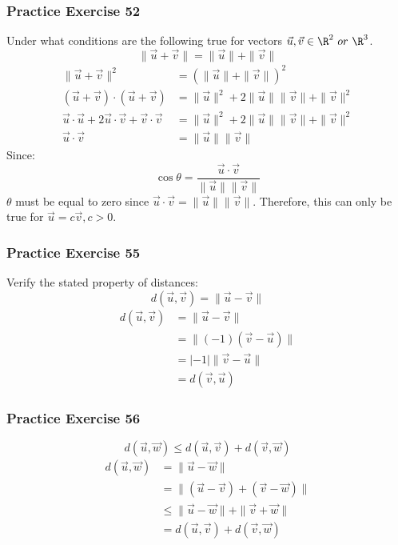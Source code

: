 \documentclass{math}
\begin{document}
\subsubsection*{Practice Exercise 52}
Under what conditions are the following true for vectors \( \vec{u},\vec{v}
\in\R^2\ or\ \R^3 \).
\[ \|\vec{u}+\vec{v}\| = \|\vec{u}\|+\|\vec{v}\| \]
\begin{align*}
  \|\vec{u}+\vec{v}\|^2 &= (\|\vec{u}\|+\|\vec{v}\|)^2 \\
  (\vec{u}+\vec{v})\cdot(\vec{u}+\vec{v}) &= \|\vec{u}\|^2+
    2\|\vec{u}\|\|\vec{v}\|+\|\vec{v}\|^2 \\
  \vec{u}\cdot\vec{u}+2\vec{u}\cdot\vec{v}+\vec{v}\cdot\vec{v} &=
    \|\vec{u}\|^2+2\|\vec{u}\|\|\vec{v}\|+\|\vec{v}\|^2 \\
  \vec{u}\cdot\vec{v} &= \|\vec{u}\|\|\vec{v}\|
\end{align*}
Since:
\[ \cos\theta = \frac{\vec{u}\cdot\vec{v}}{\|\vec{u}\|\|\vec{v}\|} \]
\( \theta \) must be equal to zero since \( \vec{u}\cdot\vec{v} =
\|\vec{u}\|\|\vec{v}\| \). Therefore, this can only be true for \( \vec{u} =
c\vec{v}, c > 0 \).

\subsubsection*{Practice Exercise 55}
Verify the stated property of distances:
\[ d(\vec{u},\vec{v}) = \|\vec{u}-\vec{v}\| \]
\begin{align*}
  d(\vec{u},\vec{v}) &= \|\vec{u}-\vec{v}\| \\
  &= \|(-1)(\vec{v}-\vec{u})\| \\
  &= |-1|\|\vec{v}-\vec{u}\| \\
  &= d(\vec{v},\vec{u})
\end{align*}

\subsubsection*{Practice Exercise 56}
\[ d(\vec{u},\vec{w}) \le d(\vec{u},\vec{v})+d(\vec{v},\vec{w}) \]
\begin{align*}
  d(\vec{u},\vec{w}) &= \|\vec{u}-\vec{w}\| \\
  &= \|(\vec{u}-\vec{v})+(\vec{v}-\vec{w})\| \\
  &\le \|\vec{u}-\vec{w}\|+\|\vec{v}+\vec{w}\| \\
  &= d(\vec{u},\vec{v})+d(\vec{v},\vec{w})
\end{align*}
\end{document}
